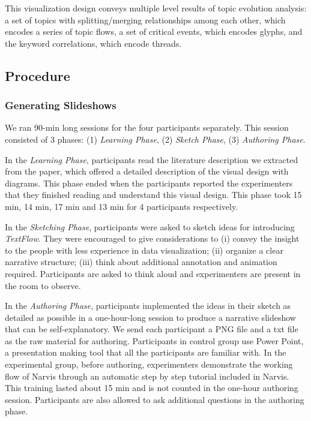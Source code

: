This visualization design conveys multiple level results of topic evolution analysis: a set of topics
with splitting/merging relationships among each other, which encodes a series of topic flows, a set of critical events, which encodes glyphs, and the keyword correlations, which encode threads.  

\subsection{Procedure}
\subsubsection{Generating Slideshows}
We ran 90-min long sessions for the four participants separately. This session consisted of 3 phases: (1) \textit{Learning Phase}, (2) \textit{Sketch Phase}, (3) \textit{Authoring Phase}.

In the \textit{Learning Phase}, participants read the literature description we extracted from the paper, which offered a detailed description of the visual design with diagrams. This phase ended when the participants reported the experimenters that they finished reading and understand this visual design. 
This phase took 15 min, 14 min, 17 min and 13 min for 4 participants respectively.

In the \textit{Sketching Phase}, participants were asked to sketch ideas for introducing \textit{TextFlow}. They were encouraged to give considerations to (i) convey the insight to the people with less experience in data visualization; (ii) organize a clear narrative structure; (iii) think about additional annotation and animation required. Participants are asked to think aloud and experimenters are present in the room to observe. 

In the \textit{Authoring Phase}, participants implemented the ideas in their sketch as detailed as possible in a one-hour-long session to produce a narrative slideshow that can be self-explanatory. We send each participant a PNG file and a txt file as the raw material for authoring. Participants in control group use Power Point, a presentation making tool that all the participants are familiar with. In the experimental group, before authoring, experimenters demonstrate the working flow of Narvis through an automatic step by step tutorial included in Narvis. This training lasted about 15 min and is not counted in the one-hour authoring session. Participants are also allowed to ask additional questions in the authoring phase.

